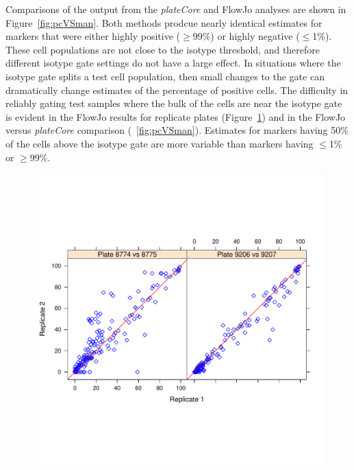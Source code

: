 \documentclass[12pt]{article}
\newcommand{\Rpackage}[1]{{\textit{#1}}}
\begin{document}
Comparisons of the output from the \Rpackage{plateCore} and FlowJo analyses are
shown in Figure~\ref{fig:pcVSman}. Both methods prodcue nearly identical
estimates for markers that were either highly positive ($\ge$99\%) or highly
negative ($\le$1\%). These cell populations are not close to the isotype
threshold, and therefore different isotype gate settings do not have a large
effect. In situations where the isotype gate splits a test cell population, then
small changes to the gate can dramatically change estimates of the percentage
of positive cells. The difficulty in reliably gating test samples where the
bulk of the cells are near the isotype gate is evident in the FlowJo results
for replicate plates (Figure~\ref{fig:replicate}) and in the FlowJo versus
\Rpackage{plateCore} comparison (~\ref{fig:pcVSman}). Estimates for markers
having 50\% of the cells above the isotype gate are more variable than markers
having $\le$1\% or $\ge$99\%.



\begin{figure}
\centering
\includegraphics{replicate.pdf}
\caption{}
\label{fig:replicate}
\end{figure}
\end{document}

